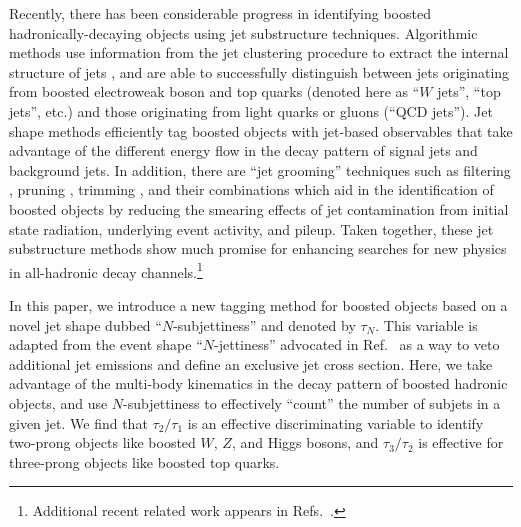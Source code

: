 \documentclass{JHEP3}
\DeclareRobustCommand{\Ref}[1]{Ref.~\cite{#1}}
\DeclareRobustCommand{\Refs}[1]{Refs.~\cite{#1}}
\begin{document}
Recently, there has been considerable progress in identifying boosted hadronically-decaying objects using jet substructure techniques.  Algorithmic methods use information from the jet clustering procedure to extract the internal structure of jets \cite{Seymour:1993mx,Butterworth:2002tt,YSplitter,Brooijmans:2008,Thaler:2008ju,Kaplan:2008ie}, and are able to successfully distinguish between jets originating from boosted electroweak boson and top quarks (denoted here as ``$W$ jets'', ``top jets'', etc.) and those originating from light quarks or gluons (``QCD jets'').   Jet shape methods efficiently tag boosted objects with jet-based observables that take advantage of the different energy flow in the decay pattern of signal jets and background jets. \cite{Almeida:2008yp}  In addition, there are ``jet grooming'' techniques such as filtering \cite{Butterworth:2008iy, Butterworth:2008tr}, pruning \cite{Ellis:2009su,Ellis:2009me}, trimming \cite{Krohn:2009th}, and their combinations \cite{Soper:2010xk} which aid in the identification of boosted objects by reducing the smearing effects of jet contamination from initial state radiation, underlying event activity, and pileup.  Taken together, these jet substructure methods show much promise for enhancing searches for new physics in all-hadronic decay channels.\footnote{Additional recent related work appears in \Refs{Butterworth:2009qa,Plehn:2009rk,Kribs:2009yh,Gallicchio:2010sw,Chen:2010wk,Falkowski:2010hi,Kribs:2010hp,Almeida:2010pa,Plehn:2010st,Bhattacherjee:2010za,Rehermann:2010vq,Hackstein:2010wk,Englert:2010ud,Katz:2010mr}.}

In this paper, we introduce a new tagging method for boosted objects based on a novel jet shape dubbed ``$N$-subjettiness'' and denoted by $\tau_N$.  This variable is adapted from the event shape ``$N$-jettiness'' advocated in \Ref{Stewart:2010tn} as a way to veto additional jet emissions and define an exclusive jet cross section.  Here, we take advantage of the multi-body kinematics in the decay pattern of boosted hadronic objects, and use $N$-subjettiness to effectively ``count'' the number of subjets in a given jet.  We find that  $\tau_2/\tau_1$ is an effective discriminating variable to identify two-prong objects like boosted $W$, $Z$, and Higgs bosons, and $\tau_3/\tau_2$ is effective for three-prong objects like boosted top quarks.  
\end{document}
